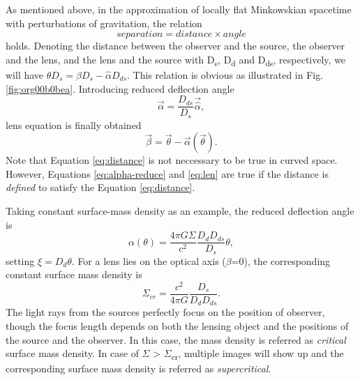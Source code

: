 \documentclass[letter,12pt]{article}
\begin{document}
As mentioned above, in the approximation of locally flat Minkowskian
spacetime with perturbations of gravitation, the relation
\begin{equation}
separation = distance \times angle \label{eq:distance}
\end{equation}
holds.  Denoting the distance between the observer and the source,
the observer and the lens, and the lens and the source with D\textsubscript{s}, D\textsubscript{d}
and D\textsubscript{ds}, respectively, we will have \(\theta D_s = \beta D_s -
  \hat{\alpha}D_{ds}\). This relation is obvious as illustrated in
Fig. \ref{fig:org00b0bea}.  Introducing reduced deflection angle
  \begin{equation}
\vec{\alpha} = \frac{D_{ds}}{D_s} \vec{\hat{\alpha}},
\label{eq:alpha-reduce}
  \end{equation}
lens equation is finally obtained
  \begin{equation}
\vec{\beta} = \vec{\theta} - \vec{\alpha}(\vec{\theta}). \label{eq:len}
  \end{equation}
Note that Equation \eqref{eq:distance} is not neccessary to be true in
curved space. However, Equations \eqref{eq:alpha-reduce} and
\eqref{eq:len} are true if the distance is \emph{defined} to satisfy the
Equation \eqref{eq:distance}.

Taking constant surface-mass density as an example, the reduced deflection angle is
  \begin{equation}
\alpha(\theta) = \frac{4\pi G\Sigma}{c^2}\frac{D_d D_{ds}}{D_s} \theta, \label{eq:alpha-reduce-circular}
  \end{equation}
setting \(\xi = D_d \theta\). For a lens lies on the optical axis
(\(\beta\)=0), the corresponding constant surface mass density is
\begin{equation}
\Sigma_{cr} = \frac{c^2}{4\pi G} \frac{D_s}{D_d D_{ds}}. \label{eq:sigma-critical}
\end{equation}
The light rays from the sources perfectly focus on the position of
observer, though the focus length depends on both the lensing object
and the positions of the source and the observer. In this case, the
mass density is referred as \emph{critical} surface mass density. In case
of \(\Sigma\) > \(\Sigma\)\textsubscript{cr}, multiple images will show up and the
corresponding surface mass density is referred as \emph{supercritical}.
\end{document}
